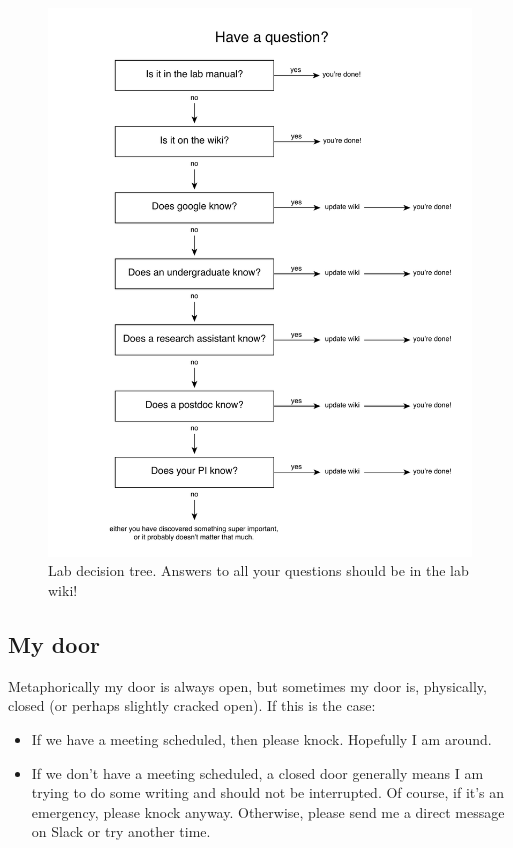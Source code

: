 \documentclass[letterpaper,12pt,oneside]{memoir}
\begin{document}
\begin{figure}
\label{fig:decisiontree}
\includegraphics[width=\textwidth]{figures/lab_decision_tree.pdf}
\caption{Lab decision tree. Answers to all your questions should be in the lab wiki!}
\end{figure}

\subsection{My door}
Metaphorically my door is always open, but sometimes my door is, physically, closed (or perhaps slightly cracked open). If this is the case:

\begin{itemize}
\item If we have a meeting scheduled, then please knock. Hopefully I am around.
\item If we don't have a meeting scheduled, a closed door generally means I am trying to do some writing and should not be interrupted. Of course, if it's an emergency, please knock anyway. Otherwise, please send me a direct message on Slack or try another time.
\end{itemize}
\end{document}
